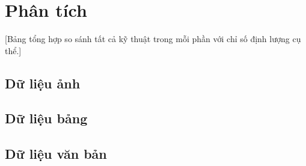 \section{Phân tích}
\label{sec:analysis}

[Bảng tổng hợp so sánh tất cả kỹ thuật trong mỗi phần với chỉ số định lượng cụ thể.]

\subsection{Dữ liệu ảnh}

\subsection{Dữ liệu bảng}

\subsection{Dữ liệu văn bản}
